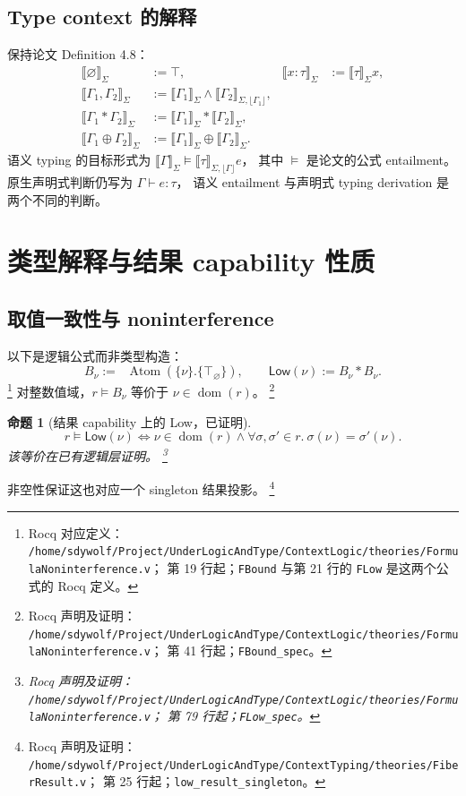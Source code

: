 \documentclass[UTF8,a4paper,11pt,fontset=fandol]{ctexart}
\newcommand{\dom}{\operatorname{dom}}
\newcommand{\Atom}{\operatorname{Atom}}
\newcommand{\omod}{\mathop{\boxed{\scriptstyle\mathrm{o}}}\nolimits}
\newcommand{\Low}{\ensuremath{\mathsf{Low}}}
\newcommand{\Den}[1]{\llbracket #1\rrbracket}
\newcommand{\rocqnote}[3]{%
  \footnote{Rocq 声明及证明：
  \nolinkurl{/home/sdywolf/Project/UnderLogicAndType/#1}；
  第 #2 行起；#3。}}
\newcommand{\rocqdefnote}[3]{%
  \footnote{Rocq 对应定义：
  \nolinkurl{/home/sdywolf/Project/UnderLogicAndType/#1}；
  第 #2 行起；#3。}}
\newtheorem{proposition}[definition]{命题}
\begin{document}
\subsection{Type context 的解释}

保持论文 Definition 4.8：
\begin{align*}
 \Den{\varnothing}_\Sigma&:=\top,&
 \Den{x:\tau}_\Sigma&:=\Den{\tau}_\Sigma x,\\
 \Den{\Gamma_1,\Gamma_2}_\Sigma&:=
       \Den{\Gamma_1}_\Sigma\land\Den{\Gamma_2}_{\Sigma,\lfloor\Gamma_1\rfloor},\\
 \Den{\Gamma_1\ast\Gamma_2}_\Sigma&:=
       \Den{\Gamma_1}_\Sigma\ast\Den{\Gamma_2}_\Sigma,\\
 \Den{\Gamma_1\oplus\Gamma_2}_\Sigma&:=
       \Den{\Gamma_1}_\Sigma\oplus\Den{\Gamma_2}_\Sigma.
\end{align*}
语义 typing 的目标形式为 $\Den{\Gamma}_\Sigma\models\Den{\tau}_{\Sigma,\lfloor\Gamma\rfloor}e$，
其中 $\models$ 是论文的公式 entailment。原生声明式判断仍写为 $\Gamma\vdash e:\tau$，
语义 entailment 与声明式 typing derivation 是两个不同的判断。

\section{类型解释与结果 capability 性质}

\subsection{取值一致性与 noninterference}

以下是逻辑公式而非类型构造：
\[
 B_\nu:=\omod\Atom(\{\nu\}.\{\top_{\varnothing}\}),\qquad
 \Low(\nu):=B_\nu\ast B_\nu.
\]
\rocqdefnote{ContextLogic/theories/FormulaNoninterference.v}{19}{\texttt{FBound} 与第 21 行的 \texttt{FLow} 是这两个公式的 Rocq 定义}
对整数值域，$r\models B_\nu$ 等价于 $\nu\in\dom(r)$。\rocqnote{ContextLogic/theories/FormulaNoninterference.v}{41}{\texttt{FBound\_spec}}

\begin{proposition}[结果 capability 上的 Low，已证明]
\begin{equation}\label{eq:low}
 r\models\Low(\nu)\Longleftrightarrow
 \nu\in\dom(r)\land\forall\sigma,\sigma'\in r.\ \sigma(\nu)=\sigma'(\nu).
\end{equation}
该等价在已有逻辑层证明。\rocqnote{ContextLogic/theories/FormulaNoninterference.v}{79}{\texttt{FLow\_spec}}
\end{proposition}
非空性保证这也对应一个 singleton 结果投影。\rocqnote{ContextTyping/theories/FiberResult.v}{25}{\texttt{low\_result\_singleton}}
\end{document}
